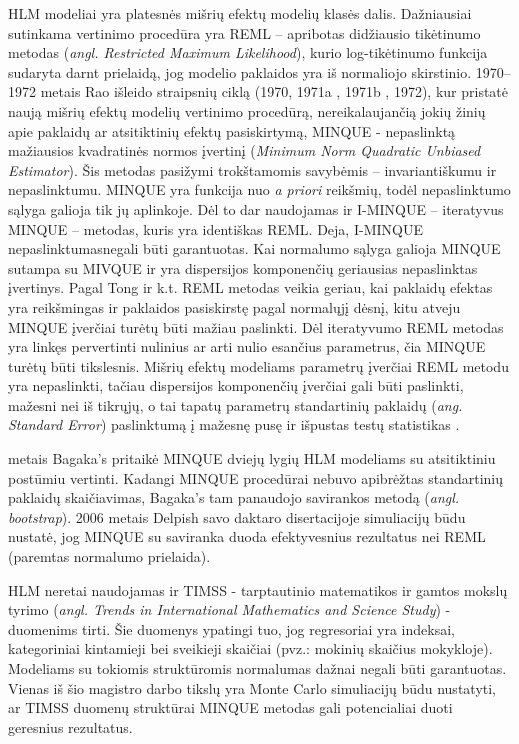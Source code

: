 \documentclass[12pt,a4paper]{article}
\begin{document}
\indent HLM modeliai yra platesnės mišrių efektų modelių klasės dalis. Dažniausiai sutinkama vertinimo procedūra yra REML -- apribotas didžiausio tikėtinumo metodas (\textit{angl. Restricted Maximum Likelihood}), kurio log-tikėtinumo funkcija sudaryta darnt prielaidą, jog modelio paklaidos yra iš normaliojo skirstinio. 1970--1972 metais Rao išleido straipsnių ciklą  (1970\cite{rao1970}, 1971a\cite{rao1971a} , 1971b\cite{rao1971b} , 1972\cite{rao1972}), kur pristatė naują mišrių efektų modelių vertinimo procedūrą, nereikalaujančią jokių žinių apie paklaidų ar atsitiktinių efektų pasiskirtymą, MINQUE - nepaslinktą mažiausios kvadratinės normos įvertinį (\textit{Minimum Norm Quadratic Unbiased Estimator}). Šis metodas pasižymi trokštamomis savybėmis -- invariantiškumu ir nepaslinktumu. MINQUE yra funkcija nuo \textit{a priori} reikšmių, todėl nepaslinktumo sąlyga galioja tik jų aplinkoje. Dėl to dar naudojamas ir I-MINQUE -- iteratyvus MINQUE -- metodas, kuris yra identiškas REML. Deja, I-MINQUE nepaslinktumasnegali būti garantuotas. Kai normalumo sąlyga galioja MINQUE sutampa su MIVQUE ir yra dispersijos komponenčių geriausias nepaslinktas įvertinys\cite{rao1971b}. Pagal Tong ir k.t. \cite{MLbetterMINQUE} REML metodas veikia geriau, kai paklaidų efektas yra reikšmingas ir paklaidos pasiskirstę pagal normalųjį dėsnį, kitu atveju MINQUE įverčiai turėtų būti mažiau paslinkti. Dėl iteratyvumo REML metodas yra linkęs pervertinti nulinius ar arti nulio esančius parametrus, čia MINQUE turėtų būti tikslesnis. Mišrių efektų modeliams parametrų įverčiai REML metodu yra nepaslinkti, tačiau dispersijos komponenčių įverčiai gali būti paslinkti, mažesni nei iš tikrųjų, o tai tapatų parametrų standartinių paklaidų (\textit{ang. Standard Error}) paslinktumą į mažesnę pusę ir išpustas testų statistikas \cite{downwardbias}.

 metais Bagaka's\cite{bagaka} pritaikė MINQUE dviejų lygių HLM modeliams su atsitiktiniu postūmiu vertinti. Kadangi MINQUE procedūrai nebuvo apibrėžtas standartinių paklaidų skaičiavimas, Bagaka's tam panaudojo savirankos metodą (\textit{angl. bootstrap}). 2006 metais Delpish\cite{delpish} savo daktaro disertacijoje simuliacijų būdu nustatė, jog MINQUE su saviranka duoda efektyvesnius rezultatus nei REML (paremtas normalumo prielaida).

\indent HLM neretai naudojamas ir TIMSS - tarptautinio matematikos ir gamtos mokslų tyrimo (\textit{angl. Trends in International Mathematics and Science Study}) - duomenims tirti. Šie duomenys ypatingi tuo, jog regresoriai yra indeksai, kategoriniai kintamieji bei sveikieji skaičiai (pvz.: mokinių skaičius mokykloje)\cite{timssug}. Modeliams su tokiomis struktūromis normalumas dažnai negali būti garantuotas.  Vienas iš šio magistro darbo tikslų yra Monte Carlo simuliacijų būdu nustatyti, ar TIMSS duomenų struktūrai MINQUE metodas gali potencialiai duoti geresnius rezultatus.
\end{document}
